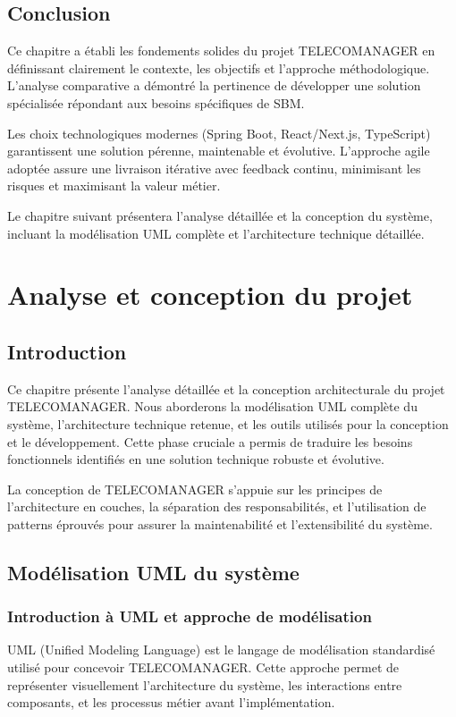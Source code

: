 \documentclass[12pt,a4paper]{report}
\begin{document}
\section{Conclusion}

Ce chapitre a établi les fondements solides du projet TELECOMANAGER en définissant clairement le contexte, les objectifs et l'approche méthodologique. L'analyse comparative a démontré la pertinence de développer une solution spécialisée répondant aux besoins spécifiques de SBM.

Les choix technologiques modernes (Spring Boot, React/Next.js, TypeScript) garantissent une solution pérenne, maintenable et évolutive. L'approche agile adoptée assure une livraison itérative avec feedback continu, minimisant les risques et maximisant la valeur métier.

Le chapitre suivant présentera l'analyse détaillée et la conception du système, incluant la modélisation UML complète et l'architecture technique détaillée.
\chapter{Analyse et conception du projet}

\section{Introduction}
Ce chapitre présente l'analyse détaillée et la conception architecturale du projet TELECOMANAGER. Nous aborderons la modélisation UML complète du système, l'architecture technique retenue, et les outils utilisés pour la conception et le développement. Cette phase cruciale a permis de traduire les besoins fonctionnels identifiés en une solution technique robuste et évolutive.

La conception de TELECOMANAGER s'appuie sur les principes de l'architecture en couches, la séparation des responsabilités, et l'utilisation de patterns éprouvés pour assurer la maintenabilité et l'extensibilité du système.

\section{Modélisation UML du système}

\subsection{Introduction à UML et approche de modélisation}
UML (Unified Modeling Language) est le langage de modélisation standardisé utilisé pour concevoir TELECOMANAGER. Cette approche permet de représenter visuellement l'architecture du système, les interactions entre composants, et les processus métier avant l'implémentation.
\end{document}
